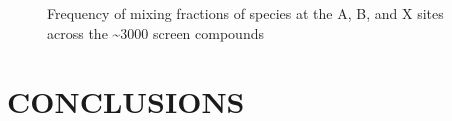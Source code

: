  
\begin{figure}[htbp]
\centering

\caption{\label{fig:freq} Frequency of mixing fractions of species at the A, B, and X sites across the \textasciitilde{}3000 screen compounds}
\end{figure}

\chapter{CONCLUSIONS}
\label{sec:org73c67ba}
